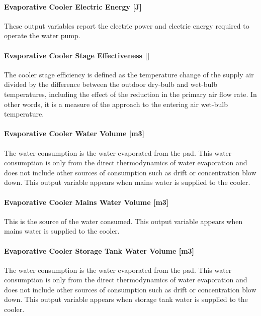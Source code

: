 \paragraph{Evaporative Cooler Electric Energy {[}J{]}}\label{evaporative-cooler-electric-energy-j-1}

These output variables report the electric power and electric energy required to operate the water pump.

\paragraph{Evaporative Cooler Stage Effectiveness {[]}}\label{evaporative-cooler-stage-effectiveness}

The cooler stage efficiency is defined as the temperature change of the supply air divided by the difference between the outdoor dry-bulb and wet-bulb temperatures, including the effect of the reduction in the primary air flow rate. In other words, it is a measure of the approach to the entering air wet-bulb temperature.

\paragraph{Evaporative Cooler Water Volume {[}m3{]}}\label{evaporative-cooler-water-volume-m3-1}

The water consumption is the water evaporated from the pad. This water consumption is only from the direct thermodynamics of water evaporation and does not include other sources of consumption such as drift or concentration blow down. This output variable appears when mains water is supplied to the cooler.

\paragraph{Evaporative Cooler Mains Water Volume {[}m3{]}}\label{evaporative-cooler-mains-water-volume-m3-1}

This is the source of the water consumed. This output variable appears when mains water is supplied to the cooler.

\paragraph{Evaporative Cooler Storage Tank Water Volume {[}m3{]}}\label{evaporative-cooler-storage-tank-water-volume-m3-1}

The water consumption is the water evaporated from the pad. This water consumption is only from the direct thermodynamics of water evaporation and does not include other sources of consumption such as drift or concentration blow down. This output variable appears when storage tank water is supplied to the cooler.


